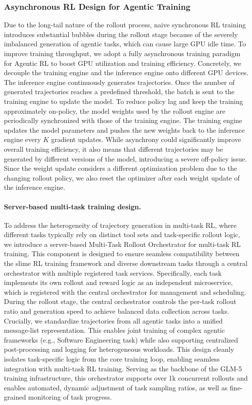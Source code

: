 \documentclass{article}
\theoremstyle{definition}
\begin{document}
\subsubsection{Asynchronous RL Design for Agentic Training}

Due to the long-tail nature of the rollout process, naive synchronous RL training introduces substantial bubbles during the rollout stage because of the severely imbalanced generation of agentic tasks, which can cause large GPU idle time. 
To improve training throughput, we adopt a fully asynchronous training paradigm for Agentic RL to boost GPU utilization and training efficiency.
Concretely, we decouple the training engine and the inference engine onto different GPU devices. 
The inference engine continuously generates trajectories. Once the number of generated trajectories reaches a predefined threshold, the batch is sent to the training engine to update the model.
To reduce policy lag and keep the training approximately on-policy, the model weights used by the rollout engine are periodically synchronized with those of the training engine. The training engine updates the model parameters and pushes the new weights back to the inference engine every $K$ gradient updates.
While asynchrony could significantly improve overall training efficiency, it also means that different trajectories may be generated by different versions of the model, introducing a severe off-policy issue. 
Since the weight update considers a different optimization problem due to the changing
rollout policy, we also reset the optimizer after each weight update of the inference engine.

\paragraph{Server-based multi-task training design.}
To address the heterogeneity of trajectory generation in multi-task RL, where different tasks typically rely on distinct tool sets and task-specific rollout logic, we introduce a server-based Multi-Task Rollout Orchestrator for multi-task RL training.
This component is designed to ensure seamless compatibility between the slime RL training framework and diverse downstream tasks through a central orchestrator with multiple registered task services. Specifically, each task implements its own rollout and reward logic as an independent microservice, which is registered with the central orchestrator for management and scheduling.
During the rollout stage, the central orchestrator controls the per-task rollout ratio and generation speed to achieve balanced data collection across tasks. Crucially, we standardize trajectories from all agentic tasks into a unified message-list representation. This enables joint training of complex agentic frameworks (e.g., Software Engineering task) while also supporting centralized post-processing and logging for heterogeneous workloads. This design cleanly isolates task-specific logic from the core training loop, enabling seamless integration with multi-task RL training.
Serving as the backbone of the GLM-5 training infrastructure, this orchestrator supports over 1k concurrent rollouts and enables automated, dynamic adjustment of task sampling ratios, as well as fine-grained monitoring of task progress.
\end{document}

